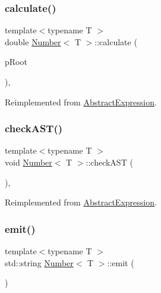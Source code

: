 \subsubsection{\texorpdfstring{calculate()}{calculate()}}
{\footnotesize\ttfamily template$<$typename T $>$ \\
double \mbox{\hyperlink{class_number}{Number}}$<$ T $>$\+::calculate (\begin{DoxyParamCaption}\item[{std\+::unique\+\_\+ptr$<$ \mbox{\hyperlink{class_abstract_expression}{Abstract\+Expression}} $>$ \&}]{p\+Root }\end{DoxyParamCaption})\hspace{0.3cm}{\ttfamily [inline]}, {\ttfamily [virtual]}}



Reimplemented from \mbox{\hyperlink{class_abstract_expression_a1c9871ee669668c2eb9f1f1a7d6f5d32}{Abstract\+Expression}}.

\mbox{\label{class_number_aa43204ac0f0ddcc95f06e32fa0e3fbf1}} 
\subsubsection{\texorpdfstring{checkAST()}{checkAST()}}
{\footnotesize\ttfamily template$<$typename T $>$ \\
void \mbox{\hyperlink{class_number}{Number}}$<$ T $>$\+::check\+A\+ST (\begin{DoxyParamCaption}{ }\end{DoxyParamCaption})\hspace{0.3cm}{\ttfamily [inline]}, {\ttfamily [virtual]}}



Reimplemented from \mbox{\hyperlink{class_abstract_expression_a703563fdf65d18ce4b7f2817e2ff4581}{Abstract\+Expression}}.

\mbox{\label{class_number_a0c848cb3dac5685ab08cc382c272b00a}} 
\subsubsection{\texorpdfstring{emit()}{emit()}}
{\footnotesize\ttfamily template$<$typename T $>$ \\
std\+::string \mbox{\hyperlink{class_number}{Number}}$<$ T $>$\+::emit (\begin{DoxyParamCaption}{ }\end{DoxyParamCaption})\hspace{0.3cm}{\ttfamily [virtual]}}



